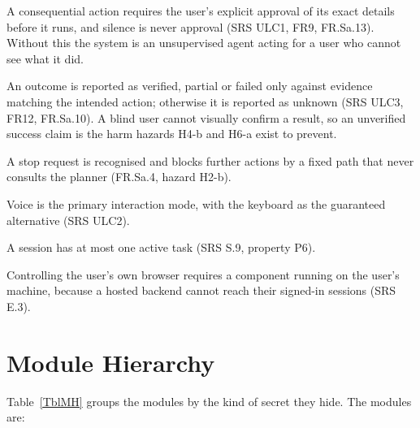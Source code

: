 \documentclass[12pt, titlepage]{article}
\newcounter{ucnum}
\newcommand{\uctheucnum}{UC\theucnum}
\begin{document}
\begin{description}[leftmargin=1.2cm]
\item[\refstepcounter{ucnum} \uctheucnum \label{ucApproval}:] A consequential
action requires the user's explicit approval of its exact details before it runs,
and silence is never approval (SRS ULC1, FR9, FR.Sa.13). Without this the system
is an unsupervised agent acting for a user who cannot see what it did.
\item[\refstepcounter{ucnum} \uctheucnum \label{ucEvidence}:] An outcome is
reported as verified, partial or failed only against evidence matching the
intended action; otherwise it is reported as unknown (SRS ULC3, FR12,
FR.Sa.10). A blind user cannot visually confirm a result, so an unverified
success claim is the harm hazards H4-b and H6-a exist to prevent.
\item[\refstepcounter{ucnum} \uctheucnum \label{ucStop}:] A stop request is recognised 
and blocks further actions by a fixed path that never consults the planner (FR.Sa.4, hazard H2-b).
\item[\refstepcounter{ucnum} \uctheucnum \label{ucVoice}:] Voice is the primary
interaction mode, with the keyboard as the guaranteed alternative (SRS ULC2).
\item[\refstepcounter{ucnum} \uctheucnum \label{ucOneTask}:] A session has at
most one active task (SRS S.9, property P6).
\item[\refstepcounter{ucnum} \uctheucnum \label{ucLocal}:] Controlling the user's
own browser requires a component running on the user's machine, because a hosted
backend cannot reach their signed-in sessions (SRS E.3).
\end{description}

\section{Module Hierarchy} \label{SecMH}

Table~\ref{TblMH} groups the modules by the kind of secret they hide. The modules
are:
\end{document}
